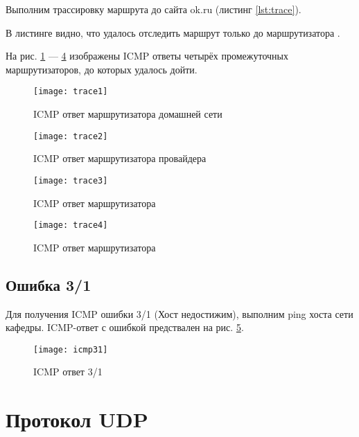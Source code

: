 Выполним трассировку маршрута до сайта ok.ru (листинг \ref{lst:trace}).



В листинге видно, что удалось отследить маршрут только до маршрутизатора .

На рис. \ref{fig:trace1} --- \ref{fig:trace4} изображены ICMP ответы четырёх промежуточных маршрутизаторов, до которых удалось дойти.

\begin{figure}[H]
	\centering
	\texttt{[image: trace1]}
	\caption{ICMP ответ маршрутизатора домашней сети}
	\label{fig:trace1}
\end{figure}

\begin{figure}[H]
	\centering
	\texttt{[image: trace2]}
	\caption{ICMP ответ маршрутизатора провайдера }
	\label{fig:trace2}
\end{figure}

\begin{figure}[H]
	\centering
	\texttt{[image: trace3]}
	\caption{ICMP ответ маршрутизатора }
	\label{fig:trace3}
\end{figure}

\begin{figure}[H]
	\centering
	\texttt{[image: trace4]}
	\caption{ICMP ответ маршрутизатора }
	\label{fig:trace4}
\end{figure}

\subsection{Ошибка 3/1}

Для получения ICMP ошибки 3/1 (Хост недостижим), выполним ping хоста  сети кафедры. ICMP-ответ с ошибкой предствален на рис. \ref{fig:icmp31}.

\begin{figure}[H]
	\centering
	\texttt{[image: icmp31]}
	\caption{ICMP ответ 3/1}
	\label{fig:icmp31}
\end{figure}

\newpage

\section{Протокол UDP}

